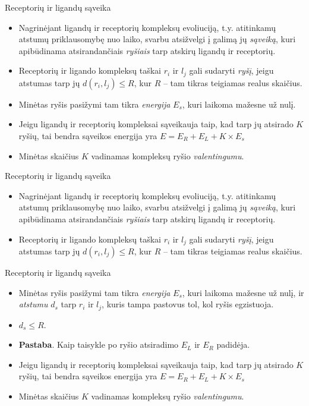 \documentclass[11pt]{beamer}
\begin{document}

\begin{frame}{Receptorių ir ligandų sąveika }
\begin{itemize}
\item Nagrinėjant ligandų ir receptorių kompleksų evoliuciją, t.y. atitinkamų atstumų priklausomybę nuo laiko, 
svarbu atsižvelgi į galimą jų \textit{sąveiką}, kuri apibūdinama atsirandančiais \textit{ryšiais} tarp atskirų ligandų ir receptorių.
\item Receptorių ir ligando kompleksų taškai $r_i$ ir $l_j$ gali sudaryti \textit{ryšį}, jeigu  atstumas tarp jų 
$d(r_i,l_j) \leqslant R$, kur $R$ -- tam tikras teigiamas realus skaičius. 
\item Minėtas ryšis pasižymi tam tikra \textit{energija} $E_s$, kuri laikoma mažesne už nulį.
\item Jeigu ligandų ir receptorių kompleksai  sąveikauja taip, kad tarp jų atsirado $K$ ryšių, tai bendra sąveikos energija
yra $E = E_R + E_L + K \times E_s$
\item Minėtas skaičius $K$ vadinamas kompleksų ryšio \textit{valentingumu}.
\end{itemize}
\end{frame}



\begin{frame}{Receptorių ir ligandų sąveika }
\begin{itemize}
\item Nagrinėjant ligandų ir receptorių kompleksų evoliuciją, t.y. atitinkamų atstumų priklausomybę nuo laiko, 
svarbu atsižvelgi į galimą jų \textit{sąveiką}, kuri apibūdinama atsirandančiais \textit{ryšiais} tarp atskirų ligandų ir receptorių.
\item Receptorių ir ligando kompleksų taškai $r_i$ ir $l_j$ gali sudaryti \textit{ryšį}, jeigu  atstumas tarp jų 
$d(r_i,l_j) \leqslant R$, kur $R$ -- tam tikras teigiamas realus skaičius. 
\end{itemize}
\end{frame}


\begin{frame}{Receptorių ir ligandų sąveika }
\begin{itemize}
\item Minėtas ryšis pasižymi tam tikra \textit{energija} $E_s$, kuri laikoma mažesne už nulį, ir 	\textit{atstumu} $d_s$ tarp $r_i$ ir $l_j$, kuris tampa pastovus tol, kol ryšis egzistuoja.
\item $d_s \leqslant R$.
\item \textbf{Pastaba}. Kaip taisykle po ryšio atsiradimo $E_L$ ir $E_R$ padidėja.
\item Jeigu ligandų ir receptorių kompleksai  sąveikauja taip, kad tarp jų atsirado $K$ ryšių, tai bendra sąveikos energija yra $E = E_R + E_L + K \times E_s$
\item Minėtas skaičius $K$ vadinamas kompleksų ryšio \textit{valentingumu}.

\end{itemize}
\end{frame}
\end{document}
